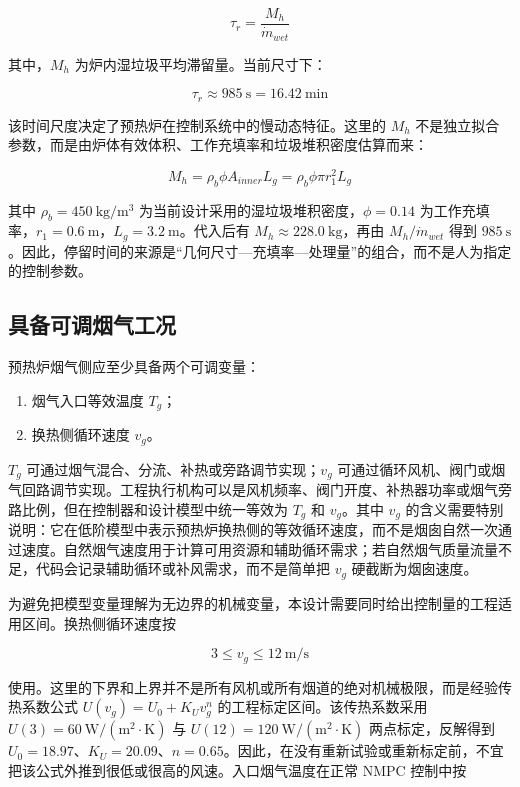 \documentclass[UTF8,openany,zihao=-4,oneside]{ctexbook}
\providecommand{\tightlist}{\setlength{\itemsep}{0pt}\setlength{\parskip}{0pt}}
\begin{document}
\[
\tau_r=\frac{M_h}{\dot m_{wet}}
\]

其中，\(M_h\) 为炉内湿垃圾平均滞留量。当前尺寸下：

\[
\tau_r\approx985\ \mathrm{s}=16.42\ \mathrm{min}
\]

该时间尺度决定了预热炉在控制系统中的慢动态特征。这里的 \(M_h\) 不是独立拟合参数，而是由炉体有效体积、工作充填率和垃圾堆积密度估算而来：

\[
M_h=\rho_b\phi A_{inner}L_g=\rho_b\phi\pi r_1^2L_g
\]

其中 \(\rho_b=450\ \mathrm{kg/m^3}\) 为当前设计采用的湿垃圾堆积密度，\(\phi=0.14\) 为工作充填率，\(r_1=0.6\ \mathrm{m}\)，\(L_g=3.2\ \mathrm{m}\)。代入后有 \(M_h\approx228.0\ \mathrm{kg}\)，再由 \(M_h/\dot m_{wet}\) 得到 \(985\ \mathrm{s}\)。因此，停留时间的来源是“几何尺寸—充填率—处理量”的组合，而不是人为指定的控制参数。

\subsection{具备可调烟气工况}\label{ux5177ux5907ux53efux8c03ux70dfux6c14ux5de5ux51b5}

预热炉烟气侧应至少具备两个可调变量：

\begin{enumerate}
\def\labelenumi{\arabic{enumi}.}
\tightlist
\item
  烟气入口等效温度 \(T_g\)；
\item
  换热侧循环速度 \(v_g\)。
\end{enumerate}

\(T_g\) 可通过烟气混合、分流、补热或旁路调节实现；\(v_g\) 可通过循环风机、阀门或烟气回路调节实现。工程执行机构可以是风机频率、阀门开度、补热器功率或烟气旁路比例，但在控制器和设计模型中统一等效为 \(T_g\) 和 \(v_g\)。其中 \(v_g\) 的含义需要特别说明：它在低阶模型中表示预热炉换热侧的等效循环速度，而不是烟囱自然一次通过速度。自然烟气速度用于计算可用资源和辅助循环需求；若自然烟气质量流量不足，代码会记录辅助循环或补风需求，而不是简单把 \(v_g\) 硬截断为烟囱速度。

为避免把模型变量理解为无边界的机械变量，本设计需要同时给出控制量的工程适用区间。换热侧循环速度按

\[
3\le v_g\le12\ \mathrm{m/s}
\]

使用。这里的下界和上界并不是所有风机或所有烟道的绝对机械极限，而是经验传热系数公式 \(U(v_g)=U_0+K_Uv_g^n\) 的工程标定区间。该传热系数采用 \(U(3)=60\ \mathrm{W/(m^2\cdot K)}\) 与 \(U(12)=120\ \mathrm{W/(m^2\cdot K)}\) 两点标定，反解得到 \(U_0=18.97\)、\(K_U=20.09\)、\(n=0.65\)。因此，在没有重新试验或重新标定前，不宜把该公式外推到很低或很高的风速。入口烟气温度在正常 NMPC 控制中按
\end{document}
